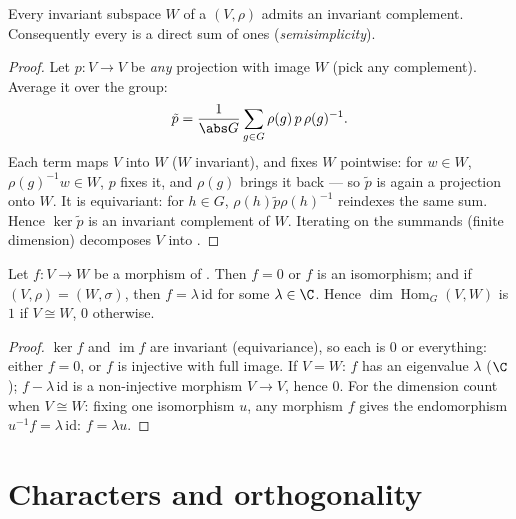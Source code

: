 \begin{theorem}[Maschke]\label{thm:b3:representations:maschke}
Every invariant subspace $W$ of a  $(V, \rho)$
admits an invariant complement. Consequently every 
is a direct sum of  ones
(\emph{semisimplicity}).
\end{theorem}

\begin{proof}
Let $p \colon V \to V$ be \emph{any} projection with image $W$
(pick any complement). Average it over the group:
\[
\tilde p = \frac1{\abs G}\sum_{g \in G} \rho(g)\,p\,\rho(g)^{-1}.
\]
Each term maps $V$ into $W$ ($W$ invariant), and fixes $W$
pointwise: for $w \in W$, $\rho(g)^{-1}w \in W$, $p$ fixes it,
and $\rho(g)$ brings it back --- so $\tilde p$ is again a
projection onto $W$. It is equivariant: for $h \in G$,
$\rho(h)\tilde p\rho(h)^{-1}$ reindexes the same sum. Hence $\ker
\tilde p$ is an invariant complement of $W$. Iterating on the
summands (finite dimension) decomposes $V$ into .
\end{proof}

\begin{theorem}\label{thm:b3:representations:schur}
Let $f \colon V \to W$ be a morphism of \emph{}
. Then $f = 0$ or $f$ is an isomorphism; and if
$(V,\rho) = (W,\sigma)$, then $f = \lambda\,\mathrm{id}$ for some
$\lambda \in \C$. Hence
$\dim\operatorname{Hom}_G(V, W)$ is $1$ if $V \cong W$, $0$
otherwise.
\end{theorem}

\begin{proof}
$\ker f$ and $\operatorname{im} f$ are invariant (equivariance),
so each is $0$ or everything: either $f = 0$, or $f$ is injective
with full image. If $V = W$: $f$ has an eigenvalue $\lambda$ ($\C$
); $f - \lambda\,\mathrm{id}$ is a
non-injective morphism $V \to V$, hence $0$. For the dimension
count when $V \cong W$: fixing one isomorphism $u$, any morphism
$f$ gives the endomorphism $u^{-1}f = \lambda\,\mathrm{id}$: $f =
\lambda u$.
\end{proof}

\section{Characters and orthogonality}

